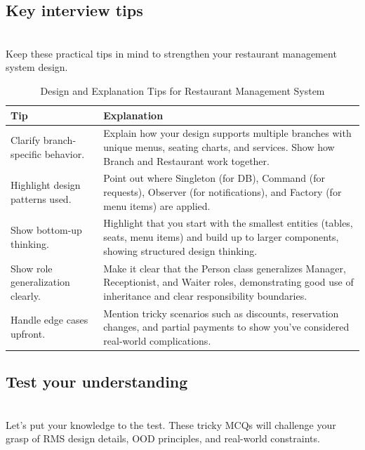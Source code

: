 \subsection{Key interview tips}\label{za2BHOChJACzG_Utc0via}
\\
Keep these practical tips in mind to strengthen your restaurant management system design.

\begin{table}[h!]
\centering
\begin{tabularx}{\textwidth}{|X|X|}
\hline
\textbf{Tip} & \textbf{Explanation} \\
\hline
Clarify branch-specific behavior. & Explain how your design supports multiple branches with unique menus, seating charts, and services. Show how Branch and Restaurant work together. \\
\hline
Highlight design patterns used. & Point out where Singleton (for DB), Command (for requests), Observer (for notifications), and Factory (for menu items) are applied. \\
\hline
Show bottom-up thinking. & Highlight that you start with the smallest entities (tables, seats, menu items) and build up to larger components, showing structured design thinking. \\
\hline
Show role generalization clearly. & Make it clear that the Person class generalizes Manager, Receptionist, and Waiter roles, demonstrating good use of inheritance and clear responsibility boundaries. \\
\hline
Handle edge cases upfront. & Mention tricky scenarios such as discounts, reservation changes, and partial payments to show you’ve considered real-world complications. \\
\hline
\end{tabularx}
\caption{Design and Explanation Tips for Restaurant Management System}
\label{tab:restaurant_tips}
\end{table}


\subsection{Test your understanding}\label{0VslWNU97bYcyMolqJtFv}
\\
Let's put your knowledge to the test. These tricky MCQs will challenge your grasp of RMS design details, OOD principles, and real-world constraints.

